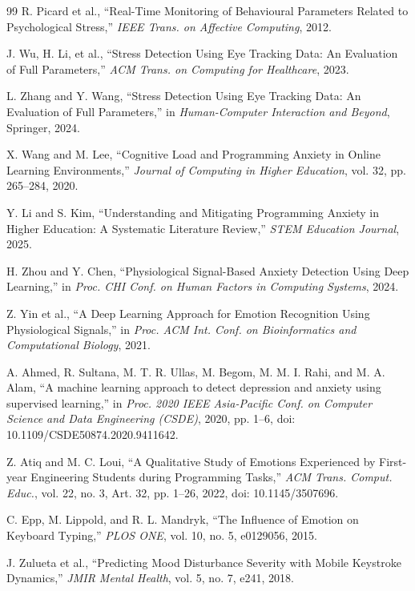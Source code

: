 \documentclass[a4paper,11pt]{report}
\begin{document}
\begin{thebibliography}{99}
 R. Picard et al., ``Real-Time Monitoring of Behavioural Parameters Related to Psychological Stress,'' \emph{IEEE Trans. on Affective Computing}, 2012. 

 J. Wu, H. Li, et al., ``Stress Detection Using Eye Tracking Data: An Evaluation of Full Parameters,'' \emph{ACM Trans. on Computing for Healthcare}, 2023. 

 L. Zhang and Y. Wang, ``Stress Detection Using Eye Tracking Data: An Evaluation of Full Parameters,'' in \emph{Human-Computer Interaction and Beyond}, Springer, 2024. 

 X. Wang and M. Lee, ``Cognitive Load and Programming Anxiety in Online Learning Environments,'' \emph{Journal of Computing in Higher Education}, vol. 32, pp. 265--284, 2020. 

 Y. Li and S. Kim, ``Understanding and Mitigating Programming Anxiety in Higher Education: A Systematic Literature Review,'' \emph{STEM Education Journal}, 2025. 

 H. Zhou and Y. Chen, ``Physiological Signal-Based Anxiety Detection Using Deep Learning,'' in \emph{Proc. CHI Conf. on Human Factors in Computing Systems}, 2024. 

 Z. Yin et al., ``A Deep Learning Approach for Emotion Recognition Using Physiological Signals,'' in \emph{Proc. ACM Int. Conf. on Bioinformatics and Computational Biology}, 2021. 

 A. Ahmed, R. Sultana, M. T. R. Ullas, M. Begom, M. M. I. Rahi, and M. A. Alam, ``A machine learning approach to detect depression and anxiety using supervised learning,'' in \emph{Proc. 2020 IEEE Asia-Pacific Conf. on Computer Science and Data Engineering (CSDE)}, 2020, pp. 1--6, doi: 10.1109/CSDE50874.2020.9411642. 

 Z. Atiq and M. C. Loui, ``A Qualitative Study of Emotions Experienced by First-year Engineering Students during Programming Tasks,'' \emph{ACM Trans. Comput. Educ.}, vol. 22, no. 3, Art. 32, pp. 1–26, 2022, doi: 10.1145/3507696. 

 C. Epp, M. Lippold, and R. L. Mandryk, ``The Influence of Emotion on Keyboard Typing,'' \emph{PLOS ONE}, vol. 10, no. 5, e0129056, 2015. 

 J. Zulueta et al., ``Predicting Mood Disturbance Severity with Mobile Keystroke Dynamics,'' \emph{JMIR Mental Health}, vol. 5, no. 7, e241, 2018. 


\end{thebibliography}
\end{document}
